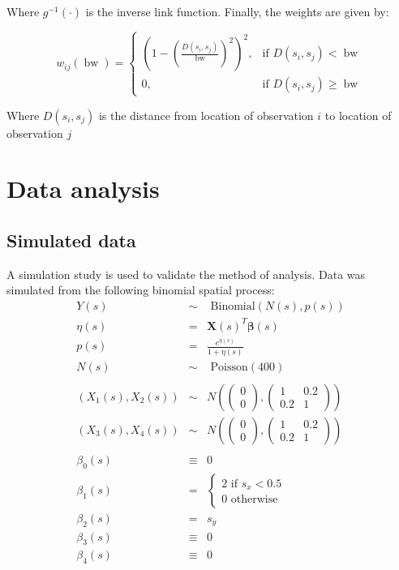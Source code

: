 \documentclass[authoryear ,review]{elsarticle}
\DeclareMathOperator*{\bw}{\mbox{bw}}
\newcommand{\vect}[1]{\boldsymbol{#1}}
\begin{document}
		Where $g^{-1}(\cdot)$ is the inverse link function. Finally, the weights are given by:
		
		\[
			w_{ij}(\bw) =  \begin{cases} \left(1-\left(\frac{D(s_i,s_j)}{\bw}\right)^2\right)^2, & \mbox{if } D(s_i,s_j) < \bw \\
			0, & \mbox{if }D(s_i,s_j) \ge \bw \end{cases}
		\]		
		
		Where $D(s_i,s_j)$ is the distance from location of observation $i$ to location of observation $j$

	\section{Data analysis}
		\subsection{Simulated data}
			 A simulation study is used to validate the method of analysis. Data was simulated from the following binomial spatial process:\\
			\begin{eqnarray*}
				Y(s) &\sim& \text{ Binomial} \left(N(s), p(s) \right)\\
				\eta(s) &=& \vect{X}(s)^T \vect{\beta}(s)\\
				p(s) &=& \frac{e^{\eta(s)}}{1+\eta(s)}\\
				N(s) &\sim& \text{ Poisson} \left( 400 \right)\\
				\\
				\left( X_1(s), X_2(s) \right) &\sim& N \left( \left( \begin{array}{c} 0 \\ 0 \end{array} \right), \left( \begin{array}{cc} 1 & 0.2 \\ 0.2 & 1 \end{array} \right) \right)\\
				\left( X_3(s), X_4(s) \right) &\sim& N \left( \left( \begin{array}{c} 0 \\ 0 \end{array} \right), \left( \begin{array}{cc} 1 & 0.2 \\ 0.2 & 1 \end{array} \right) \right)\\
				\\
				\beta_0(s) &\equiv& 0\\				
				\beta_1(s) &=& \begin{cases}  2 \text{  if } s_x < 0.5 \\ 0 \text{  otherwise}  \end{cases}\\
				\beta_2(s) &=& s_y\\
				\beta_3(s) &\equiv& 0\\
				\beta_4(s) &\equiv& 0
			\end{eqnarray*}
			
\end{document}
